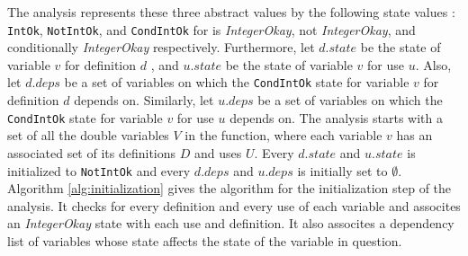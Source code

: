 The analysis represents these three abstract values by the following state
values : \texttt{IntOk}, \texttt{NotIntOk}, and \texttt{CondIntOk} for is
\emph{IntegerOkay}, not \emph{IntegerOkay}, and conditionally \emph{IntegerOkay}
respectively.  Furthermore, let $d.state$ be the state of variable $v$ for
definition $d$ , and $u.state$ be the state of variable $v$ for use $u$. Also,
let $d.deps$ be a set of variables on which the \texttt{CondIntOk} state for
variable $v$ for definition $d$ depends on.  Similarly, let $u.deps$ be a set of
variables on which the \texttt{CondIntOk} state for variable $v$ for use $u$
depends on. The analysis starts with a set of all the double variables $V$ in
the \matlab function, where each variable $v$ has an associated set of its
definitions $D$ and uses $U$. Every $d.state$ and $u.state$ is initialized to
\texttt{NotIntOk} and every $d.deps$ and $u.deps$ is initially set to
$\emptyset$. Algorithm \ref{alg:initialization} gives the algorithm for the
initialization step of the analysis. It checks for every definition and every
use of each variable and assocites an \emph{IntegerOkay} state with each use and
definition. It also assocites a dependency list of variables whose state affects
the state of the variable in question.

